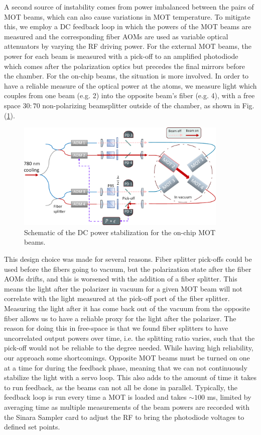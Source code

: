 A second source of instability comes from power imbalanced between the pairs of MOT beams, which can also cause variations in MOT temperature. To mitigate this, we employ a DC feedback loop in which the powers of the MOT beams are measured and the corresponding fiber AOMs are used as variable optical attenuators by varying the RF driving power. For the external MOT beams, the power for each beam is measured with a pick-off to an amplified photodiode \cite{Ebert2017thesis} which comes after the polarization optics but precedes the final mirrors before the chamber. For the on-chip beams, the situation is more involved. In order to have a reliable measure of the optical power at the atoms, we measure light which couples from one beam (e.g. 2) into the opposite beam's fiber (e.g. 4), with a free space $30:70$ non-polarizing beamsplitter outside of the chamber, as shown in Fig. (\ref{fig:mot_feedback}). 
\begin{figure}[!ht]
    \centering
    \includegraphics[width=0.9\textwidth]{Images/on_chip_mot_feedback.pdf}
    \caption{Schematic of the DC power stabilization for the on-chip
    MOT beams.}
    \label{fig:mot_feedback}
\end{figure}
This design choice was made for several reasons. Fiber splitter pick-offs could be used before the fibers going to vacuum, but the polarization state after the fiber AOMs drifts, and this is worsened with the addition of a fiber splitter. This means the light after the polarizer in vacuum for a given MOT beam will not correlate with the light measured at the pick-off port of the fiber splitter. Measuring the light after it has come back out of the vacuum  from the opposite fiber allows us to have a reliable proxy for the  light after the polarizer. The reason for doing this in free-space is that we found fiber splitters to have uncorrelated output powers over time, i.e. the splitting ratio varies, such that the pick-off would not be reliable to the degree needed. While having high reliability, our approach some shortcomings. Opposite MOT beams must be turned on one at a time for during the feedback phase, meaning that we can not continuously stabilize the light with a servo loop. This also adds to the amount of time it takes to run feedback, as the beams can not all be done in parallel. Typically, the feedback loop is run every time a MOT is loaded and takes $\sim 100$ ms, limited by averaging time as multiple measurements of the beam powers are recorded with the Sinara Sampler card to adjust the RF to bring the photodiode voltages to defined set points.

